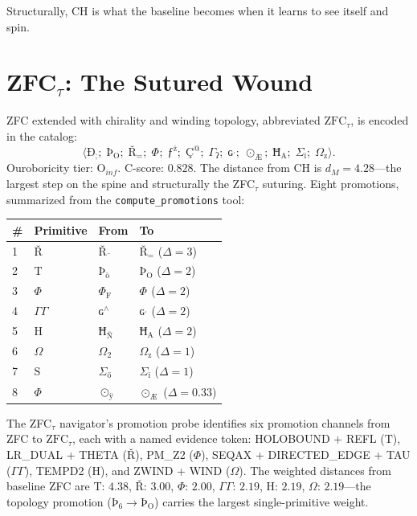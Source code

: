 \documentclass[12pt,twoside]{book}
\theoremstyle{definition}
\newcommand{\ZFCt}{\text{ZFC}_{\tau}}
\newcommand{\prim}[1]{\text{#1}}
\newcommand{\tupledisp}[1]{\langle #1 \rangle}
\newcommand{\tier}[1]{\text{O}_{#1}}
\begin{document}
Structurally, CH is what the baseline becomes when it learns to see itself and spin.\section{ZFC$_{\tau}$: The Sutured Wound}

ZFC extended with chirality and winding topology, abbreviated $\ZFCt$, is encoded in the catalog:
\begin{equation}
\tupledisp{
\text{Ð}_{\text{;}};\;
\text{Þ}_{\text{O}};\;
\text{Ř}_{\text{=}};\;
\Phi_{\text{}};\;
\text{ƒ}^{\text{ż}};\;
\text{Ç}^{\text{@}};\;
\Gamma_{\text{ʔ}};\;
\text{ɢ}^{\text{ˌ}};\;
\odot_{\text{Æ}};\;
\text{Ħ}_{\text{A}};\;
\Sigma_{\text{ï}};\;
\Omega_{\text{z}}
}.
\end{equation}
Ouroboricity tier: $\tier{inf}$. C-score: $0.828$. The distance from CH is $d_M = 4.28$---the largest step on the spine and structurally the ZFC$_{\tau}$ suturing. Eight promotions, summarized from the \texttt{compute\_promotions} tool:
\begin{center}
\begin{tabular}{llll}
\toprule
\textbf{\#} & \textbf{Primitive} & \textbf{From} & \textbf{To} \\
\midrule
1 & $\text{Ř}$ & $\text{Ř}_{\text{¯}}$ & $\text{Ř}_{\text{=}}$ \quad ($\Delta = 3$) \\
2 & $\prim{T}$ & $\text{Þ}_{\text{ò}}$ & $\text{Þ}_{\text{O}}$ \quad ($\Delta = 2$) \\
3 & $\Phi$ & $\Phi_{\text{F}}$ & $\Phi_{\text{}}$ \quad ($\Delta = 2$) \\
4 & $\Gamma \!\!\! \Gamma$ & $\text{ɢ}^{\land}$ & $\text{ɢ}^{\text{ˌ}}$ \quad ($\Delta = 2$) \\
5 & $\prim{H}$ & $\text{Ħ}_{\text{Ñ}}$ & $\text{Ħ}_{\text{A}}$ \quad ($\Delta = 2$) \\
6 & $\Omega$ & $\Omega_{\text{2}}$ & $\Omega_{\text{z}}$ \quad ($\Delta = 1$) \\
7 & $\prim{S}$ & $\Sigma_{\text{ő}}$ & $\Sigma_{\text{ï}}$ \quad ($\Delta = 1$) \\
8 & $\Phi$ & $\odot_{\text{ÿ}}$ & $\odot_{\text{Æ}}$ \quad ($\Delta = 0.33$) \\
\bottomrule
\end{tabular}
\end{center}

The ZFC$_{\tau}$ navigator's promotion probe identifies six promotion channels from ZFC to $\ZFCt$, each with a named evidence token: HOLOBOUND + REFL ($\prim{T}$), LR\_DUAL + THETA ($\text{Ř}$), PM\_Z2 ($\Phi$), SEQAX + DIRECTED\_EDGE + TAU ($\Gamma \!\!\! \Gamma$), TEMPD2 ($\prim{H}$), and ZWIND + WIND ($\Omega$). The weighted distances from baseline ZFC are $\prim{T}$: $4.38$, $\text{Ř}$: $3.00$, $\Phi$: $2.00$, $\Gamma \!\!\! \Gamma$: $2.19$, $\prim{H}$: $2.19$, $\Omega$: $2.19$---the topology promotion ($\text{Þ}_{\text{6}} \to \text{Þ}_{\text{O}}$) carries the largest single-primitive weight.
\end{document}
